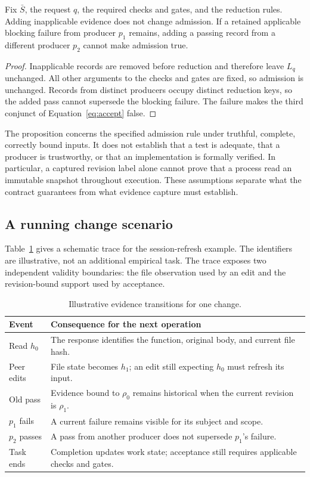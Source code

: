 \begin{proposition}
\label{prop:preservation}
Fix $\bar S$, the request $q$, the required checks and gates, and the reduction rules. Adding inapplicable evidence does not change admission. If a retained applicable blocking failure from producer $p_1$ remains, adding a passing record from a different producer $p_2$ cannot make admission true.
\end{proposition}
\begin{proof}
Inapplicable records are removed before reduction and therefore leave $L_q$ unchanged. All other arguments to the checks and gates are fixed, so admission is unchanged. Records from distinct producers occupy distinct reduction keys, so the added pass cannot supersede the blocking failure. The failure makes the third conjunct of Equation~\eqref{eq:accept} false.
\end{proof}

The proposition concerns the specified admission rule under truthful, complete, correctly bound inputs. It does not establish that a test is adequate, that a producer is trustworthy, or that an implementation is formally verified. In particular, a captured revision label alone cannot prove that a process read an immutable snapshot throughout execution. These assumptions separate what the contract guarantees from what evidence capture must establish.

\subsection{A running change scenario}
Table~\ref{tab:trace} gives a schematic trace for the session-refresh example. The identifiers are illustrative, not an additional empirical task. The trace exposes two independent validity boundaries: the file observation used by an edit and the revision-bound support used by acceptance.

\begin{table}[t]
\small
\caption{Illustrative evidence transitions for one change.}
\label{tab:trace}
\begin{tabularx}{\columnwidth}{@{}p{}X@{}}
\toprule
Event & Consequence for the next operation\\
\midrule
Read $h_0$ & The response identifies the function, original body, and current file hash.\\
Peer edits & File state becomes $h_1$; an edit still expecting $h_0$ must refresh its input.\\
Old pass & Evidence bound to $\rho_0$ remains historical when the current revision is $\rho_1$.\\
$p_1$ fails & A current failure remains visible for its subject and scope.\\
$p_2$ passes & A pass from another producer does not supersede $p_1$'s failure.\\
Task ends & Completion updates work state; acceptance still requires applicable checks and gates.\\
\bottomrule
\end{tabularx}
\end{table}

